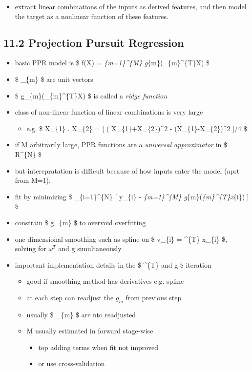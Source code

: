 \documentclass[11pt]{article}
\providecommand{\tightlist}{%
      \setlength{\itemsep}{0pt}\setlength{\parskip}{0pt}}
\begin{document}
\begin{itemize}
\tightlist
\item
  extract linear combinations of the inputs as derived features, and
  then model the target as a nonlinear function of these features.
\end{itemize}

\subsection{11.2 Projection Pursuit
Regression}\label{projection-pursuit-regression}

\begin{itemize}
\tightlist
\item
  basic PPR model is \$ f(X) = \sum\emph{\{m=1\}\^{}\{M\}
  g}\{m\}(\omega\_\{m\}\^{}\{T\}X) \$
\item
  \$ \omega\_\{m\} \$ are unit vectors
\item
  \$ g\_\{m\}(\omega\_\{m\}\^{}\{T\}X) \$ is called a \emph{ridge
  function}
\item
  class of non-linear function of linear combinations is very large

  \begin{itemize}
  \tightlist
  \item
    e.g. \$ X\_\{1\} . X\_\{2\} = {[} ( X\_\{1\}+X\_\{2\})\^{}2 -
    (X\_\{1\}-X\_\{2\})\^{}2 {]}/4 \$
  \end{itemize}
\item
  if M arbitrarily large, PPR functions are a \emph{universal
  approximator} in \$ R\^{}\{N\} \$
\item
  but interepratation is difficult because of how inputs enter the model
  (aprt from M=1).
\item
  fit by minimizing \$ \sum\_\{i=1\}\^{}\{N\} {[} y\_\{i\} -
  \sum\emph{\{m=1\}\^{}\{M\} g}\{m\}(\omega\emph{\{m\}\^{}\{T\}x}\{i\})
  {]} \$
\item
  constrain \$ g\_\{m\} \$ to overvoid overfitting
\item
  one dimensional smoothing such as spline on \$ v\_\{i\} =
  \omega\^{}\{T\} x\_\{i\} \$, solving for \(\omega^{T}\) and g
  simultaneously
\item
  important implementation details in the \$ \omega\^{}\{T\} and g \$
  iteration

  \begin{itemize}
  \tightlist
  \item
    good if smoothing method has derivatives e.g. spline
  \item
    at each step can readjust the \(g_{m}\) from previous step
  \item
    usually \$ \omega\_\{m\} \$ are nto readjusted
  \item
    M usually estimated in forward stage-wise

    \begin{itemize}
    \tightlist
    \item
      top adding terms when fit not improved
    \item
      or use cross-validation
    \end{itemize}
  \end{itemize}
\end{itemize}
\end{document}
